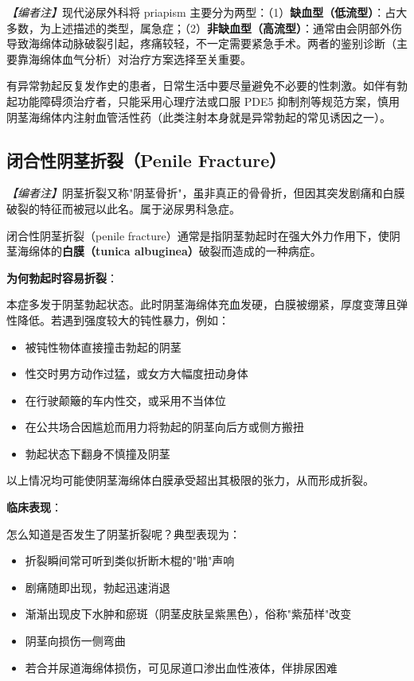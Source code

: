 \noindent\textit{【编者注】}现代泌尿外科将 priapism 主要分为两型：（1）\textbf{缺血型（低流型）}：占大多数，为上述描述的类型，属急症；（2）\textbf{非缺血型（高流型）}：通常由会阴部外伤导致海绵体动脉破裂引起，疼痛较轻，不一定需要紧急手术。两者的鉴别诊断（主要靠海绵体血气分析）对治疗方案选择至关重要。

\begin{tcolorbox}[colback=pink!5!white,colframe=red!50!black,title=贴心小叮咛]
有异常勃起反复发作史的患者，日常生活中要尽量避免不必要的性刺激。如伴有勃起功能障碍须治疗者，只能采用心理疗法或口服 PDE5 抑制剂等规范方案，慎用阴茎海绵体内注射血管活性药（此类注射本身就是异常勃起的常见诱因之一）。
\end{tcolorbox}

\subsection{闭合性阴茎折裂（Penile Fracture）}

\noindent\textit{【编者注】}阴茎折裂又称"阴茎骨折"，虽非真正的骨骨折，但因其突发剧痛和白膜破裂的特征而被冠以此名。属于泌尿男科急症。

\vspace{0.5em}
闭合性阴茎折裂（penile fracture）通常是指阴茎勃起时在强大外力作用下，使阴茎海绵体的\textbf{白膜（tunica albuginea）}破裂而造成的一种病症。

\vspace{0.5em}
\noindent\textbf{为何勃起时容易折裂}：

本症多发于阴茎勃起状态。此时阴茎海绵体充血发硬，白膜被绷紧，厚度变薄且弹性降低。若遇到强度较大的钝性暴力，例如：
\begin{itemize}
	\item 被钝性物体直接撞击勃起的阴茎
	\item 性交时男方动作过猛，或女方大幅度扭动身体
	\item 在行驶颠簸的车内性交，或采用不当体位
	\item 在公共场合因尴尬而用力将勃起的阴茎向后方或侧方搬扭
	\item 勃起状态下翻身不慎撞及阴茎
\end{itemize}
以上情况均可能使阴茎海绵体白膜承受超出其极限的张力，从而形成折裂。

\vspace{0.5em}
\noindent\textbf{临床表现}：

怎么知道是否发生了阴茎折裂呢？典型表现为：
\begin{itemize}
	\item 折裂瞬间常可听到类似折断木棍的"啪"声响
	\item 剧痛随即出现，勃起迅速消退
	\item 渐渐出现皮下水肿和瘀斑（阴茎皮肤呈紫黑色），俗称"紫茄样"改变
	\item 阴茎向损伤一侧弯曲
	\item 若合并尿道海绵体损伤，可见尿道口渗出血性液体，伴排尿困难
\end{itemize}

